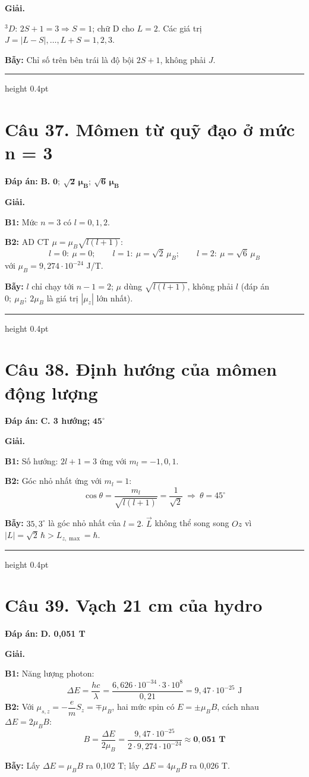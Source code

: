 \documentclass[11pt,a4paper]{article}
\renewcommand{\boldsymbol}[1]{\symbf{#1}}
\newcommand{\Cau}[2]{\par\Needspace{7\baselineskip}\section*{Câu #1. #2}}
\newcommand{\DapAn}[1]{\textbf{Đáp án:} #1\par}
\newcommand{\Bay}[1]{\par\textbf{Bẫy:} #1\par}
\newcommand{\PhanCachBai}{%
  \par\Needspace{7\baselineskip}%
  \addvspace{6pt}%
  {\color{black!40}\hrule height 0.4pt}%
  \nobreak\vspace{7pt}\nobreak
}
\begin{document}
\textbf{Giải.}

${}^3D$: $2S+1=3\Rightarrow S=1$; chữ D cho $L=2$. Các giá trị $J=|L-S|,\dots,L+S=1,2,3$.
\Bay{Chỉ số trên bên trái là độ bội $2S+1$, không phải $J$.}

\PhanCachBai
\Cau{37}{Mômen từ quỹ đạo ở mức n = 3}
\DapAn{\textbf{B.} $\boldsymbol{0;\ \sqrt2\,\mu_B;\ \sqrt6\,\mu_B}$}

\textbf{Giải.}

\textbf{B1:} Mức $n=3$ có $l=0,1,2$.

\textbf{B2:} AD CT $\mu=\mu_B\sqrt{l(l+1)}$:
\begin{equation*}
    l=0:\ \mu=0;\qquad l=1:\ \mu=\sqrt2\,\mu_B;\qquad l=2:\ \mu=\sqrt6\,\mu_B
\end{equation*}
với $\mu_B=9{,}274\cdot10^{-24}$ J/T.
\Bay{$l$ chỉ chạy tới $n-1=2$; $\mu$ dùng $\sqrt{l(l+1)}$, không phải $l$ (đáp án $0;\ \mu_B;\ 2\mu_B$ là giá trị $|\mu_z|$ lớn nhất).}

\PhanCachBai
\Cau{38}{Định hướng của mômen động lượng}
\DapAn{\textbf{C. 3 hướng;} $\boldsymbol{45^\circ}$}

\textbf{Giải.}

\textbf{B1:} Số hướng: $2l+1=3$ ứng với $m_l=-1,0,1$.

\textbf{B2:} Góc nhỏ nhất ứng với $m_l=1$:
\begin{equation*}
    \cos\theta=\frac{m_l}{\sqrt{l(l+1)}}=\frac{1}{\sqrt2}\ \Longrightarrow\ \theta=45^\circ
\end{equation*}
\Bay{$35{,}3^\circ$ là góc nhỏ nhất của $l=2$. $\vec L$ không thể song song $Oz$ vì $|L|=\sqrt2\,\hbar>L_{z,\max}=\hbar$.}

\PhanCachBai
\Cau{39}{Vạch 21 cm của hydro}
\DapAn{\textbf{D. 0,051 T}}

\textbf{Giải.}

\textbf{B1:} Năng lượng photon:
\begin{equation*}
    \Delta E=\frac{hc}{\lambda}=\frac{6{,}626\cdot10^{-34}\cdot3\cdot10^{8}}{0{,}21}=9{,}47\cdot10^{-25}\text{ J}
\end{equation*}
\textbf{B2:} Với $\mu_{s,z}=-\dfrac{e}{m}S_z=\mp\mu_B$, hai mức spin có $E=\pm\mu_BB$, cách nhau $\Delta E=2\mu_BB$:
\begin{equation*}
    B=\frac{\Delta E}{2\mu_B}=\frac{9{,}47\cdot10^{-25}}{2\cdot9{,}274\cdot10^{-24}}\approx\boldsymbol{0{,}051\text{ T}}
\end{equation*}
\Bay{Lấy $\Delta E=\mu_BB$ ra 0,102 T; lấy $\Delta E=4\mu_BB$ ra 0,026 T.}
\end{document}
